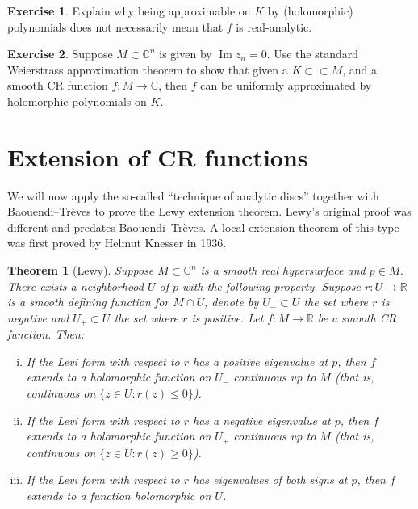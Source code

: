 \documentclass[12pt,openany]{book}
\renewcommand{\Im}{\operatorname{Im}}
\newcommand{\C}{{\mathbb{C}}}
\newcommand{\R}{{\mathbb{R}}}
\theoremstyle{plain}
\newtheorem{thm}{Theorem}[section]
\theoremstyle{remark}
\theoremstyle{definition}
\newenvironment{exbox}{%
    \def\FrameCommand{\vrule width 1pt \relax\hspace{10pt}}%
    \MakeFramed {\advance \hsize -\width \FrameRestore}%
}{%
    \endMakeFramed
}
\theoremstyle{exercise}
\newtheorem{exercise}{Exercise}[section]
\theoremstyle{example}
\begin{document}
\begin{exbox}
\begin{exercise}
Explain why being approximable on $K$ by (holomorphic) polynomials does not
necessarily mean that
$f$ is real-analytic.
\end{exercise}

\begin{exercise}
Suppose $M \subset \C^n$ is given by $\Im z_n = 0$.  Use the standard
Weierstrass approximation theorem to show that given a $K \subset \subset M$,
and a smooth CR function $f \colon M \to \C$, then $f$ can be uniformly approximated
by holomorphic polynomials on $K$.
\end{exercise}
\end{exbox}


\section{Extension of CR functions}

We will now apply the so-called ``technique of analytic discs'' together
with
Baouendi--Tr{\`e}ves to prove the
Lewy extension theorem.  Lewy's original proof was different
and predates Baouendi--Tr{\`e}ves.  A local extension theorem of this type
was first proved by Helmut Knesser in 1936.

\begin{thm}[Lewy]%
Suppose $M \subset \C^n$ is a smooth real hypersurface and $p \in M$.
There exists a neighborhood $U$ of $p$ with the following
property.
Suppose $r \colon U \to \R$ is
a smooth defining function for $M \cap U$, denote by $U_- \subset U$ the set where $r$
is negative and $U_+ \subset U$ the set where $r$ is positive.
Let $f \colon M \to \R$ be a smooth CR function.
Then:

\begin{enumerate}[(i)]
\item
If the Levi form with respect to $r$ has a positive eigenvalue at $p$, then
$f$ extends to a holomorphic function on $U_-$ continuous up to $M$
(that is, continuous on $\{ z \in U : r(z) \leq 0 \}$).
\item
If the Levi form with respect to $r$ has a negative eigenvalue at $p$, then
$f$ extends to a holomorphic function on $U_+$ continuous up to $M$
(that is, continuous on $\{ z \in U : r(z) \geq 0 \}$).
\item
If the Levi form with respect to $r$ has eigenvalues of both signs at $p$, then
$f$ extends to a function holomorphic on $U$.
\end{enumerate}
\end{thm}
\end{document}

